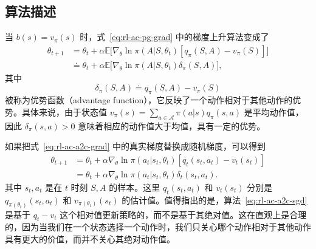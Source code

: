 \subsection{算法描述}
\label{sec:rl-ac-a2c-alg}

当 $b(s) = v_{\pi}(s)$ 时，式~\eqref{eq:rl-ac-pg-grad} 中的梯度上升算法变成了
\begin{equation}
\begin{aligned}
\theta_{t+1} &= \theta_{t} + \alpha \mathbb{E} \Big[ \nabla_{\theta} \ln \pi(A | S, \theta_{t}) [ q_{\pi}(S, A) - v_{\pi}(S) ] \Big] \\
&\doteq \theta_{t} + \alpha \mathbb{E} \Big[ \nabla_{\theta} \ln \pi(A | S, \theta_{t}) \delta_{\pi}(S, A) \Big],
\end{aligned}
\label{eq:rl-ac-a2c-grad}
\end{equation}
其中
\[
\delta_{\pi}(S, A) \doteq q_{\pi}(S, A) - v_{\pi}(S)
\]
被称为优势函数（advantage function），它反映了一个动作相对于其他动作的优势。具体来说，由于状态值 $v_{\pi}(s) = \sum_{a \in \mathcal{A}} \pi(a | s) q_{\pi}(s, a)$ 是平均动作值，因此 $\delta_{\pi}(s, a) > 0$ 意味着相应的动作值大于均值，具有一定的优势。

如果把式~\eqref{eq:rl-ac-a2c-grad} 中的真实梯度替换成随机梯度，可以得到
\begin{equation}
\begin{aligned}
\theta_{t+1} &= \theta_{t} + \alpha \nabla_{\theta} \ln \pi(a_{t} | s_{t}, \theta_{t}) [ q_{t}(s_{t}, a_{t}) - v_{t}(s_{t}) ] \\
&= \theta_{t} + \alpha \nabla_{\theta} \ln \pi(a_{t} | s_{t}, \theta_{t}) \delta_{t}(s_{t}, a_{t}).
\end{aligned}
\label{eq:rl-ac-a2c-sgd}
\end{equation}
其中 $s_{t}, a_{t}$ 是在 $t$ 时刻 $S, A$ 的样本。这里 $q_{t}(s_{t}, a_{t})$ 和 $v_{t}(s_{t})$ 分别是 $q_{\pi(\theta_{t})}(s_{t}, a_{t})$ 和 $v_{\pi(\theta_{t})}(s_{t})$ 的估计值。值得指出的是，算法~\eqref{eq:rl-ac-a2c-sgd} 是基于 $q_{t} - v_{t}$ 这个相对值更新策略的，而不是基于其绝对值。这在直观上是合理的，因为当我们在一个状态选择一个动作时，我们只关心哪个动作相对于其他动作具有更大的价值，而并不关心其绝对动作值。


